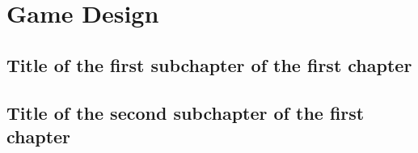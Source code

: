 \chapter{Game Design}


\section{Title of the first subchapter of the first chapter}


\section{Title of the second subchapter of the first chapter}
